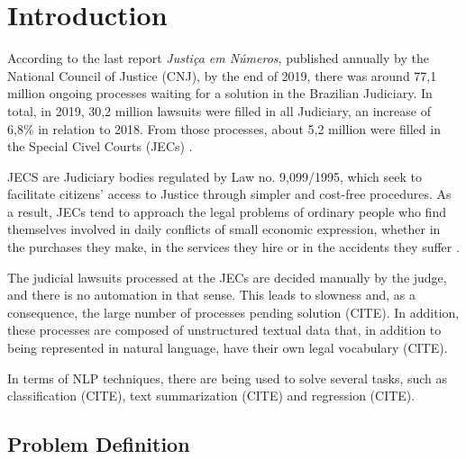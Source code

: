 \chapter{Introduction}

According to the last report \textit{Justiça em Números}, published annually by the National Council of Justice (CNJ), by the end of 2019, there was around 77,1 million ongoing processes waiting for a solution in the Brazilian Judiciary. In total, in 2019, 30,2 million lawsuits were filled in all Judiciary, an increase of 6,8\% in relation to 2018. From those processes, about 5,2 million were filled in the Special Civel Courts (JECs)  \cite{CNJ2020}. 

JECS are Judiciary bodies regulated by Law no. 9,099/1995, which seek to facilitate citizens' access to Justice through simpler and cost-free procedures. As a result, JECs tend to approach the legal problems of ordinary people who find themselves involved in daily conflicts of small economic expression, whether in the purchases they make, in the services they hire or in the accidents they suffer \cite{Watanabe1985}.

The judicial lawsuits processed at the JECs are decided manually by the judge, and there is no automation in that sense. This leads to slowness and, as a consequence, the large number of processes pending solution (CITE). In addition, these processes are composed of unstructured textual data that, in addition to being represented in natural language, have their own legal vocabulary (CITE). 


In terms of NLP techniques, there are being used to solve several tasks, such as classification (CITE), text summarization (CITE) and  regression (CITE).


\section{Problem Definition} %
% 

